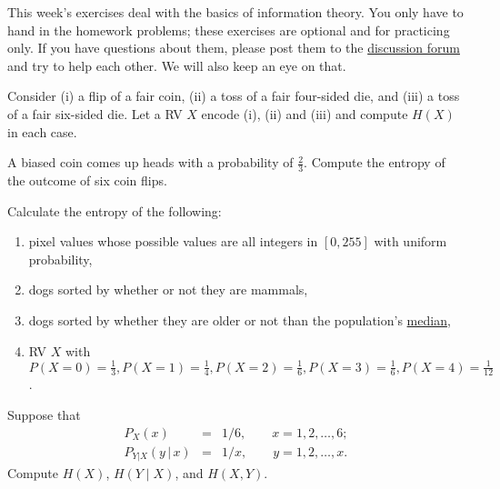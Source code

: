 \documentclass[a4paper,10pt,landscape,twocolumn]{scrartcl}
\begin{document}
\practiceproblems

{\sffamily\noindent
  This week's exercises deal with the basics of information theory. You only
  have to hand in the homework problems; these exercises are optional and for
  practicing only. If you have questions about them, please post them to the
  \href{\discussionForumURL}{discussion forum} and try to help each other. We
  will also keep an eye on that.
}


\begin{exercise}[Entropies]
  Consider (i) a flip of a fair coin, (ii) a toss of a fair four-sided die, and
  (iii) a toss of a fair six-sided die. Let a RV $X$ encode (i), (ii) and (iii)
  and compute $H(X)$ in each case.
\end{exercise}


\begin{exercise}
  A biased coin comes up heads with a probability of $\frac{2}{3}$. Compute the
  entropy of the outcome of six coin flips.
\end{exercise}


\begin{exercise}
  Calculate the entropy of the following:
  \begin{enumerate}
    \item pixel values whose possible values are all integers in $[0,255]$ with
      uniform probability,
    \item dogs sorted by whether or not they are mammals, 
    \item dogs sorted by whether they are older or not than the population's
      \href{https://en.wikipedia.org/wiki/Median}{median},
    \item RV $X$ with $P(X = 0) = \frac{1}{3}, P(X = 1) = \frac{1}{4}, P(X = 2)
      = \frac{1}{6}, P(X = 3) = \frac{1}{6}, P(X = 4) = \frac{1}{12}$.
  \end{enumerate}
\end{exercise}


\begin{exercise}
  Suppose that
  \begin{eqnarray*}
    P_{X}(x) & = & 1/6,\qquad x=1,2,\ldots,6;\\
    P_{Y|X}(y\,|\, x) & = & 1/x,\qquad y=1,2,\ldots,x.
  \end{eqnarray*}
  Compute $H(X)$, $H(Y \mid X)$, and $H(X,Y)$.
\end{exercise}

\vfill\creditspracticequestions
\end{document}
